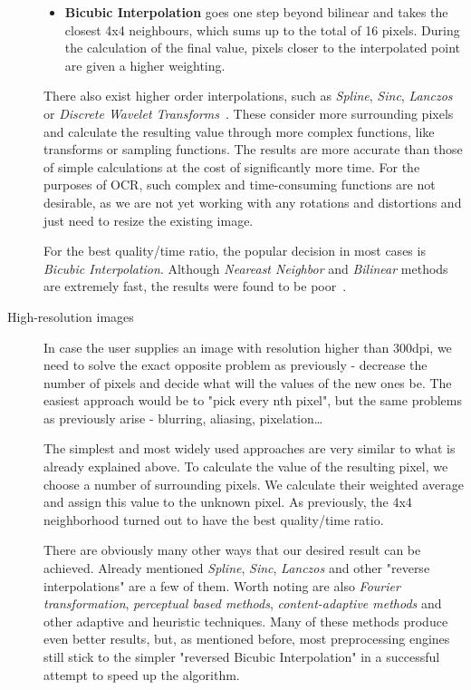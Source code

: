 \begin{description}
\begin{itemize}
\item\textbf {Bicubic Interpolation } goes one step beyond bilinear and takes the closest 4x4 neighbours, which sums up to the total of 16 pixels. During the calculation of the final value, pixels closer to the interpolated point are given a higher weighting.

\end{itemize}

There also exist higher order interpolations, such as \emph{Spline}, \emph{Sinc}, \emph{Lanczos} or \emph{Discrete Wavelet Transforms}~\cite{interpolation}. These consider more surrounding pixels and calculate the resulting value through more complex functions, like transforms or sampling functions. The results are more accurate than those of simple calculations at the cost of significantly more time. For the purposes of OCR, such complex and time-consuming functions are not desirable, as we are not yet working with any rotations and distortions and just need to resize the existing image.

For the best quality/time ratio, the popular decision in most cases is \emph{Bicubic Interpolation}. Although \emph{Neareast Neighbor} and \emph{Bilinear} methods are extremely fast, the results were found to be poor~\cite{interpolationComp}.

\item[High-resolution images] In case the user supplies an image with resolution higher than 300dpi, we need to solve the exact opposite problem as previously - decrease the number of pixels and decide what will the values of the new ones be. The easiest approach would be to "pick every nth pixel", but the same problems as previously arise - blurring, aliasing, pixelation\ldots

The simplest and most widely used approaches are very similar to what is already explained above. To calculate the value of the resulting pixel, we choose a number of surrounding pixels. We calculate their weighted average and assign this value to the unknown pixel. As previously, the 4x4 neighborhood turned out to have the best quality/time ratio.

There are obviously many other ways that our desired result can be achieved. Already mentioned \emph{Spline}, \emph{Sinc}, \emph{Lanczos} and other "reverse interpolations" are a few of them. Worth noting are also \emph{Fourier transformation}, \emph{perceptual based methods}, \emph{content-adaptive methods} and other adaptive and heuristic techniques.
Many of these methods produce even better results, but, as mentioned before, most preprocessing engines still stick to the simpler "reversed Bicubic Interpolation" in a successful attempt to speed up the algorithm.

\end{description}

